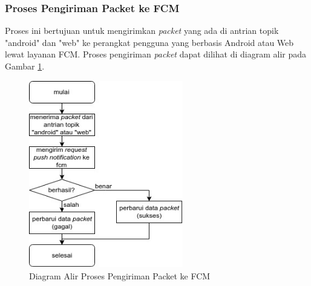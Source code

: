 \subsubsection{Proses Pengiriman Packet ke FCM}
\par Proses ini bertujuan untuk mengirimkan \textit{packet} yang ada di antrian topik "android" dan "web" ke perangkat pengguna yang berbasis Android atau Web lewat layanan FCM. Proses pengiriman \textit{packet} dapat dilihat di diagram alir pada Gambar \ref{flowchart_pengiriman_packet_ke_fcm}.
\begin{figure}[hb]
    \centering\includegraphics[width=0.6\textwidth]{bab3/flowchart/flowchart-pengiriman_packet_ke_fcm.jpg}
    \caption{Diagram Alir Proses Pengiriman Packet ke FCM} \label{flowchart_pengiriman_packet_ke_fcm}
\end{figure}

